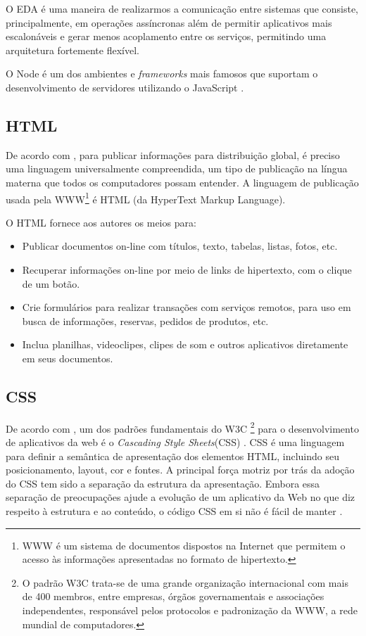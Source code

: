 O EDA é uma maneira de realizarmos a comunicação entre sistemas que consiste, principalmente, em operações assíncronas além de permitir aplicativos mais escalonáveis e gerar menos acoplamento entre os serviços, permitindo uma arquitetura fortemente flexível. 

O Node é um dos ambientes e \textit{frameworks} mais famosos que suportam o desenvolvimento de servidores utilizando o JavaScript \cite{Tilkov2010}.

\subsection{HTML}
De acordo com \citeauthor{html}, para publicar informações para distribuição global, é preciso uma linguagem universalmente compreendida, um tipo de publicação na língua materna que todos os computadores possam entender. A linguagem de publicação usada pela WWW\footnote{WWW é um sistema de documentos dispostos na Internet que permitem o acesso às informações apresentadas no formato de hipertexto.} é HTML (da HyperText Markup Language). 

O HTML fornece aos autores os meios para: 
\begin{itemize}
    \item Publicar documentos on-line com títulos, texto, tabelas, listas, fotos, etc. 
    \item Recuperar informações on-line por meio de links de hipertexto, com o clique de um botão. 
    \item Crie formulários para realizar transações com serviços remotos, para uso em busca de informações, reservas, pedidos de produtos, etc. 
    \item Inclua planilhas, videoclipes, clipes de som e outros aplicativos diretamente em seus documentos.
\end{itemize}

\subsection{CSS}
De acordo com \citeauthor{css}, um dos padrões fundamentais do W3C \footnote{O padrão W3C trata-se de uma grande organização internacional com mais de 400 membros, entre empresas, órgãos governamentais e associações independentes, responsável pelos protocolos e padronização da WWW, a rede mundial de computadores.} para o desenvolvimento de aplicativos da web é o \textit{Cascading Style Sheets}(CSS) \cite{Casca8378199:online}. CSS é uma linguagem para definir a semântica de apresentação dos elementos HTML, incluindo seu posicionamento, layout, cor e fontes. A principal força motriz por trás da adoção do CSS tem sido a separação da estrutura da apresentação. Embora essa separação de preocupações ajude a evolução de um aplicativo da Web no que diz respeito à estrutura e ao conteúdo, o código CSS em si não é fácil de manter \cite{badros1999constraint}. 

